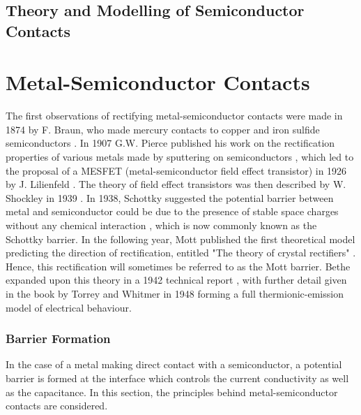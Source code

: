 \chapter{Theory and Modelling of Semiconductor Contacts}

\ifpdf
    \graphicspath{{Chapter3/Figs/Raster/}{Chapter3/Figs/PDF/}{Chapter3/Figs/}}
\else
    \graphicspath{{Chapter3/Figs/Vector/}{Chapter3/Figs/}}
\fi


\part{Metal-Semiconductor Contacts} %

\label{ch:contacts} %

The first observations of rectifying metal-semiconductor contacts were made in 1874 by F. Braun, who made mercury contacts to copper and iron sulfide semiconductors \cite{braun:1874}. In 1907 G.W. Pierce published his work on the rectification properties of various metals made by sputtering on semiconductors \cite{pierce:1907}, which led to the proposal of a MESFET (metal-semiconductor field effect transistor) in 1926 by J. Lilienfeld \cite{lilienfeld:1926}. The theory of field effect transistors was then described by W. Shockley in 1939 \cite{shockley:1939}. In 1938, Schottky suggested the potential barrier between metal and semiconductor could be due to the presence of stable space charges without any chemical interaction \cite{schottky:1938}, which is now commonly known as the Schottky barrier. In the following year, Mott published the first theoretical model predicting the direction of rectification, entitled "The theory of crystal rectifiers" \cite{mott:1939}. Hence, this rectification will sometimes be referred to as the Mott barrier. Bethe expanded upon this theory in a 1942 technical report \cite{bethe:1942}, with further detail given in the book by Torrey and Whitmer in 1948 \cite{torrey:1948} forming a full thermionic-emission model of electrical behaviour.


\section{Barrier Formation}
In the case of a metal making direct contact with a semiconductor, a potential barrier is formed at the interface which controls the current conductivity as well as the capacitance. In this section, the principles behind metal-semiconductor contacts are considered.
